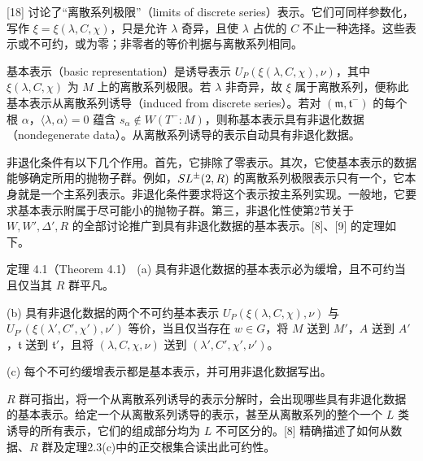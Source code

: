 [18] 讨论了“离散系列极限”（limits of discrete series）表示。它们可同样参数化，写作 $\xi=\xi(\lambda,C,\chi)$，只是允许 $\lambda$ 奇异，且使 $\lambda$ 占优的 $C$ 不止一种选择。这些表示或不可约，或为零；非零者的等价判据与离散系列相同。

基本表示（basic representation）是诱导表示 $U_P(\xi(\lambda,C,\chi),\nu)$，其中 $\xi(\lambda,C,\chi)$ 为 $M$ 上的离散系列极限。若 $\lambda$ 非奇异，故 $\xi$ 属于离散系列，便称此基本表示从离散系列诱导（induced from discrete series）。若对 $(\mathfrak m,\mathfrak t^-)$ 的每个根 $\alpha$，$\langle\lambda,\alpha\rangle=0$ 蕴含 $s_\alpha\notin W(T^-:M)$，则称基本表示具有非退化数据（nondegenerate data）。从离散系列诱导的表示自动具有非退化数据。

非退化条件有以下几个作用。首先，它排除了零表示。其次，它使基本表示的数据能够确定所用的抛物子群。例如，$SL^\pm(2,R)$ 的离散系列极限表示只有一个，它本身就是一个主系列表示。非退化条件要求将这个表示按主系列实现。一般地，它要求基本表示附属于尽可能小的抛物子群。第三，非退化性使第2节关于 $W,W',\Delta',R$ 的全部讨论推广到具有非退化数据的基本表示。[8]、[9] 的定理如下。
\begin{originaltheorem}{定理 4.1（Theorem 4.1）}
(a) 具有非退化数据的基本表示必为缓增，且不可约当且仅当其 $R$ 群平凡。

(b) 具有非退化数据的两个不可约基本表示 $U_P(\xi(\lambda,C,\chi),\nu)$ 与 $U_{P'}(\xi(\lambda',C',\chi'),\nu')$ 等价，当且仅当存在 $w\in G$，将 $M$ 送到 $M'$，$A$ 送到 $A'$，$\mathfrak t$ 送到 $\mathfrak t'$，且将 $(\lambda,C,\chi,\nu)$ 送到 $(\lambda',C',\chi',\nu')$。

(c) 每个不可约缓增表示都是基本表示，并可用非退化数据写出。
\end{originaltheorem}
$R$ 群可指出，将一个从离散系列诱导的表示分解时，会出现哪些具有非退化数据的基本表示。给定一个从离散系列诱导的表示，甚至从离散系列的整个一个 $L$ 类诱导的所有表示，它们的组成部分均为 $L$ 不可区分的。[8] 精确描述了如何从数据、$R$ 群及定理2.3(c)中的正交根集合读出此可约性。

